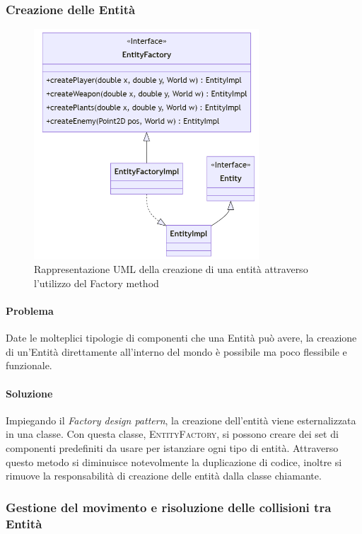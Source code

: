 \documentclass[a4paper,12pt]{report}
\begin{document}
\subsubsection{Creazione delle Entità}

\begin{figure}[H]
\centering{}
\includegraphics[width=0.75\textwidth,keepaspectratio]{img/EntityFactoryUML.png}
\caption{Rappresentazione UML della creazione di una entità attraverso l'utilizzo del Factory method}
\end{figure}

\paragraph{Problema}
    Date le molteplici tipologie di componenti che una Entità può avere, la creazione di un'Entità direttamente all'interno del mondo è possibile ma poco flessibile e funzionale. 
    
\paragraph{Soluzione}
    Impiegando il \textit{Factory design pattern},  la creazione dell'entità viene esternalizzata in una classe. Con questa classe, \textsc{EntityFactory}, si possono creare dei set di componenti predefiniti da usare per istanziare ogni tipo di entità. Attraverso questo metodo si diminuisce notevolmente la duplicazione di codice, inoltre si rimuove la responsabilità di creazione delle entità dalla classe chiamante. 

\subsubsection{Gestione del movimento e risoluzione delle collisioni tra Entità}
\end{document}
